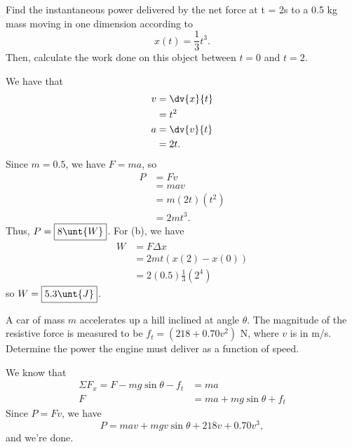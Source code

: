 \documentclass[11pt]{article}
\begin{document}
\begin{example}
	Find the instantaneous power delivered by the net force at t = 2s to a 0.5 kg mass moving in one dimension according to
	\[x(t) = \frac{1}{3}t^3.\]
	Then, calculate the work done on this object between $t = 0$ and $t = 2$.
\end{example}
\begin{solution}
	We have that
	\begin{align*}
		v &= \dv{x}{t} \\
		&= t^2 \\
		a &= \dv{v}{t} \\
		&= 2t.
	\end{align*}
	Since $m = 0.5$, we have $F = ma$, so
	\begin{align*}
	P &= Fv \\
	&= mav \\
	&= m(2t)(t^2) \\
	&= 2mt^3.
	\end{align*}
	Thus, $P = \boxed{8 \unt{W}}$. For (b), we have
	\begin{align*}
		W &= F\Delta x \\
		&= 2mt\left(x(2) - x(0)\right) \\
		&= 2(0.5)\frac{1}{3}(2^4)
	\end{align*}
	so $W = \boxed{5.3\unt{J}}$.
\end{solution}

\begin{example}
	A car of mass $m$ accelerates up a hill inclined at angle $\theta$. The magnitude of the resistive force is measured to be $f_t = (218 + 0.70v^2)$ N, where $v$ is in m/s. Determine the power the engine must deliver as a function of speed.
\end{example}
\begin{solution}
	We know that
	\begin{align*}
		\Sigma F_x = F - mg\sin\theta - f_t &= ma \\
		F &= ma + mg\sin\theta + f_t
	\end{align*}
	Since $P = Fv$, we have
	\[P = \boxed{mav + mgv\sin\theta + 218v + 0.70v^3},\]
	and we're done.
\end{solution}
\end{document}
